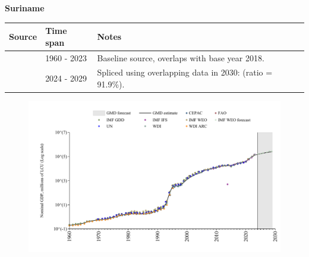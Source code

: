 \documentclass[12pt,a4paper,landscape]{article}
\begin{document}
\begin{adjustbox}{max totalsize={\paperwidth}{\paperheight},center}
\begin{minipage}[t][\textheight][t]{\textwidth}
\vspace*{0.5cm}
{}
\begin{center}
{\Large\bfseries Suriname}
\end{center}
\vspace{0.5cm}
\begin{table}[H]
\centering
\small
\begin{tabular}{|l|l|l|}
\hline
\textbf{Source} & \textbf{Time span} & \textbf{Notes} \\
\hline
\rowcolor{white}\cite{WDI}& 1960 - 2023 &Baseline source, overlaps with base year 2018.\\
\rowcolor{lightgray}\cite{IMF_WEO_forecast}& 2024 - 2029 &Spliced using overlapping data in 2030: (ratio = 91.9\%).\\
\hline
\end{tabular}
\end{table}
\begin{figure}[H]
\centering
\includegraphics[width=\textwidth,height=0.6\textheight,keepaspectratio]{graphs/SUR_nGDP.pdf}
\end{figure}
\end{minipage}
\end{adjustbox}
\end{document}
